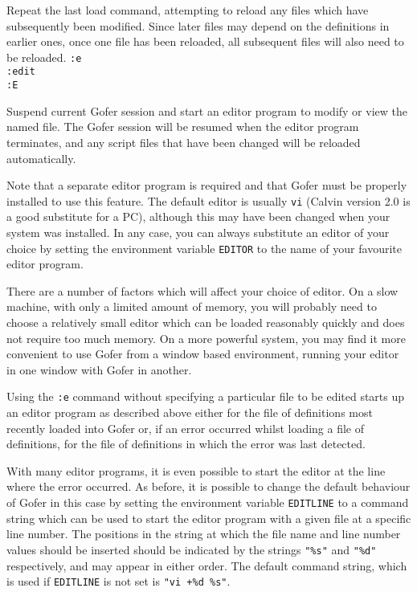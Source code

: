              Repeat the last load command,  attempting  to  reload  any
             files which have subsequently been modified.  Since  later
             files may depend on the definitions in earlier ones,  once
             one file has been reloaded, all subsequent files will also
             need to be reloaded.
\IT
\verb":e" \\
\verb":edit"\\
\verb":E"

             Suspend current Gofer session and start an editor  program
             to modify or view the named file.  The Gofer session  will
             be resumed when the editor  program  terminates,  and  any
             script files that  have  been  changed  will  be  reloaded
             automatically.

             Note that a separate editor program is required  and  that
             Gofer must be properly installed to use this feature.  The
             default editor is usually \verb"vi" (Calvin version 2.0 is a good
             substitute for a PC), although this may have been  changed
             when your system was installed.   In  any  case,  you  can
             always substitute an editor of your choice by setting  the
             environment variable \verb"EDITOR" to the name of your  favourite
             editor program.

             There are a number  of  factors  which  will  affect  your
             choice of editor.  On a slow machine, with only a  limited
             amount of memory, you  will  probably  need  to  choose  a
             relatively small editor which  can  be  loaded  reasonably
             quickly and does not require too much memory.  On  a  more
             powerful system, you may find it more  convenient  to  use
             Gofer from a window based environment, running your editor
             in one window with Gofer in another.

             Using the \verb":e" command without specifying a particular  file
             to be edited starts up  an  editor  program  as  described
             above either for the file  of  definitions  most  recently
             loaded into Gofer or, if an error occurred whilst  loading
             a file of definitions, for  the  file  of  definitions  in
             which the error was last detected.

             With many editor programs, it is even  possible  to  start
             the editor at the  line  where  the  error  occurred.   As
             before, it is possible to change the default behaviour  of
             Gofer in this case by  setting  the  environment  variable
             \verb"EDITLINE" to a command string which can be  used  to  start
             the editor program with a given file at  a  specific  line
             number.  The positions in the string  at  which  the  file
             name and line number values should be inserted  should  be
             indicated by the strings \verb="%s"= 
             and \verb="%d"=  respectively,  and
             may appear in either order.  The default  command  string,
             which is used if \verb"EDITLINE" is not set is 
             \verb="vi +%d %s"=.
\EI


